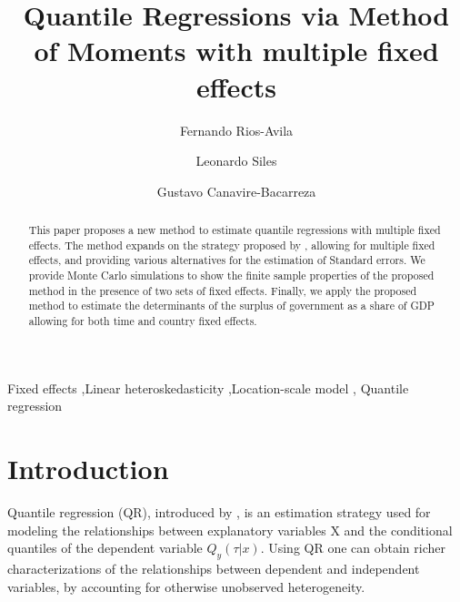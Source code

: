 \documentclass[
  authoryear,
  review,
  1p]{elsarticle}
\begin{document}
\begin{frontmatter}
\title{Quantile Regressions via Method of Moments with multiple fixed
effects}
\author[1]{Fernando Rios-Avila%
%
}
\author[2]{Leonardo Siles%
%
}
\author[3]{Gustavo Canavire-Bacarreza%
%
}




        
\begin{abstract}
This paper proposes a new method to estimate quantile regressions with
multiple fixed effects. The method expands on the strategy proposed by
\citet{mss2019}, allowing for multiple fixed effects, and providing
various alternatives for the estimation of Standard errors. We provide
Monte Carlo simulations to show the finite sample properties of the
proposed method in the presence of two sets of fixed effects. Finally,
we apply the proposed method to estimate the determinants of the surplus
of government as a share of GDP allowing for both time and country fixed
effects.
\end{abstract}





\begin{keyword}
    Fixed effects \sep Linear heteroskedasticity \sep Location-scale
model \sep 
    Quantile regression
\end{keyword}
\end{frontmatter}
    \section{Introduction}\label{introduction}

Quantile regression (QR), introduced by \citet{koenkerbasset1978}, is an
estimation strategy used for modeling the relationships between
explanatory variables X and the conditional quantiles of the dependent
variable \(Q_y (\tau|x)\). Using QR one can obtain richer
characterizations of the relationships between dependent and independent
variables, by accounting for otherwise unobserved heterogeneity.
\end{document}
